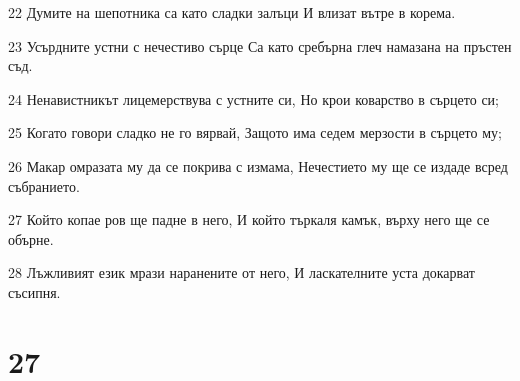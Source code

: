 \par 22 Думите на шепотника са като сладки залъци И влизат вътре в корема.
\par 23 Усърдните устни с нечестиво сърце Са като сребърна глеч намазана на пръстен съд.
\par 24 Ненавистникът лицемерствува с устните си, Но крои коварство в сърцето си;
\par 25 Когато говори сладко не го вярвай, Защото има седем мерзости в сърцето му;
\par 26 Макар омразата му да се покрива с измама, Нечестието му ще се издаде всред събранието.
\par 27 Който копае ров ще падне в него, И който търкаля камък, върху него ще се обърне.
\par 28 Лъжливият език мрази наранените от него, И ласкателните уста докарват съсипня.

\chapter{27}

